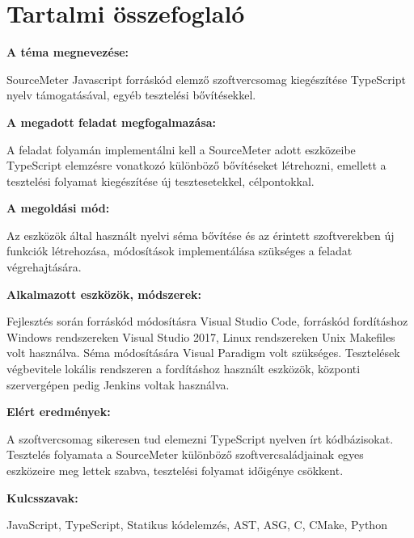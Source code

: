 \chapter*{Tartalmi összefoglaló}

\noindent\textbf{A téma megnevezése:}

\noindent SourceMeter Javascript forráskód elemző szoftvercsomag kiegészítése TypeScript nyelv támogatásával, egyéb tesztelési bővítésekkel.

\noindent\textbf{A megadott feladat megfogalmazása:}

\noindent A feladat folyamán implementálni kell a SourceMeter adott eszközeibe TypeScript elemzésre vonatkozó különböző bővítéseket létrehozni, emellett a tesztelési folyamat kiegészítése új tesztesetekkel, célpontokkal.

\noindent\textbf{A megoldási mód:}

\noindent Az eszközök által használt nyelvi séma bővítése és az érintett szoftverekben új funkciók létrehozása, módosítások implementálása szükséges a feladat végrehajtására.

\noindent\textbf{Alkalmazott eszközök, módszerek:}

\noindent Fejlesztés során forráskód módosításra Visual Studio Code, forráskód fordításhoz Windows rendszereken Visual Studio 2017, Linux rendszereken Unix Makefiles volt használva. Séma módosítására Visual Paradigm volt szükséges. Tesztelések végbevitele lokális rendszeren a fordításhoz használt eszközök, központi szervergépen pedig Jenkins voltak használva.

\noindent\textbf{Elért eredmények:}

\noindent A szoftvercsomag sikeresen tud elemezni TypeScript nyelven írt kódbázisokat. Tesztelés folyamata a SourceMeter különböző szoftvercsaládjainak egyes eszközeire meg lettek szabva, tesztelési folyamat időigénye csökkent.

\noindent\textbf{Kulcsszavak:}

\noindent JavaScript, TypeScript, Statikus kódelemzés, AST, ASG, C, CMake, Python
